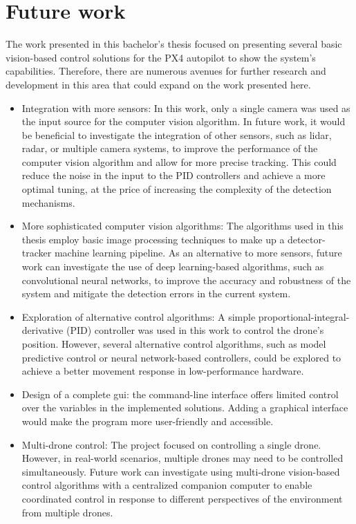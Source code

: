 \section{Future work}
\label{sec:fut-work}

The work presented in this bachelor's thesis focused on presenting several basic vision-based control solutions for the PX4 autopilot to show the system's capabilities. Therefore, there are numerous avenues for further research and development in this area that could expand on the work presented here.

\begin{itemize}
    \item Integration with more sensors: In this work, only a single camera was used as the input source for the computer vision algorithm. In future work, it would be beneficial to investigate the integration of other sensors, such as lidar, radar, or multiple camera systems, to improve the performance of the computer vision algorithm and allow for more precise tracking. This could reduce the noise in the input to the PID controllers and achieve a more optimal tuning, at the price of increasing the complexity of the detection mechanisms.

    \item More sophisticated computer vision algorithms: The algorithms used in this thesis employ basic image processing techniques to make up a detector-tracker machine learning pipeline. As an alternative to more sensors, future work can investigate the use of deep learning-based algorithms, such as convolutional neural networks, to improve the accuracy and robustness of the system and mitigate the detection errors in the current system.

    \item Exploration of alternative control algorithms: A simple proportional-integral-derivative (PID) controller was used in this work to control the drone's position. However, several alternative control algorithms, such as model predictive control or neural network-based controllers, could be explored to achieve a better movement response in low-performance hardware.

    \item Design of a complete \acrlong{gui}: the command-line interface offers limited control over the variables in the implemented solutions. Adding a graphical interface would make the program more user-friendly and accessible.

    \item Multi-drone control: The project focused on controlling a single drone. However, in real-world scenarios, multiple drones may need to be controlled simultaneously. Future work can investigate using multi-drone vision-based control algorithms with a centralized companion computer to enable coordinated control in response to different perspectives of the environment from multiple drones.


\end{itemize}
